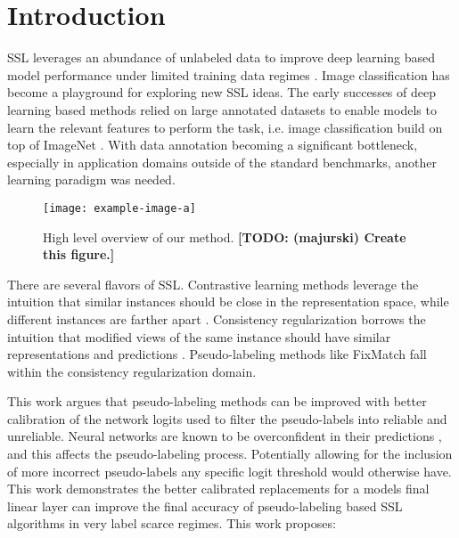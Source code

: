 \documentclass[10pt,twocolumn,letterpaper]{article}
\newcommand{\TODO}[1]{\textbf{\color{red}[TODO: #1]}}
\begin{document}
\section{Introduction}
SSL leverages an abundance of unlabeled data to improve deep learning based model performance under limited training data regimes \cite{zhu2022introduction,li2019safe,hady2013semi}.
Image classification has become a playground for exploring new SSL ideas.
The early successes of deep learning based methods relied on large annotated datasets to enable models to learn the relevant features to perform the task, i.e. image classification build on top of ImageNet \cite{deng2009imagenet}.
With data annotation becoming a significant bottleneck, especially in application domains outside of the standard benchmarks, another learning paradigm was needed.


\begin{figure}[ht]
	\centering
	\texttt{[image: example-image-a]}
	\caption{High level overview of our method. \TODO {(majurski) Create this figure.}}
	\label{fig:schema}
\end{figure}

There are several flavors of SSL.
Contrastive learning methods leverage the intuition that similar instances should be close in the representation space, while different instances are farther apart \cite{yang2022class,li2021comatch}.
Consistency regularization borrows the intuition that modified views of the same instance should have similar representations and predictions \cite{sohn2020fixmatch,lee2022contrastive,zhang2021flexmatch,kim2022conmatch}.
Pseudo-labeling methods like FixMatch \cite{sohn2020fixmatch} fall within the consistency regularization domain.

This work argues that pseudo-labeling methods can be improved with better calibration of the network logits used to filter the pseudo-labels into reliable and unreliable. 
Neural networks are known to be overconfident in their predictions \cite{wei2022mitigating}, and this affects the pseudo-labeling process. 
Potentially allowing for the inclusion of more incorrect pseudo-labels any specific logit threshold would otherwise have.
This work demonstrates the better calibrated replacements for a models final linear layer can improve the final accuracy of pseudo-labeling based SSL algorithms in very label scarce regimes. 
This work proposes:
\end{document}
